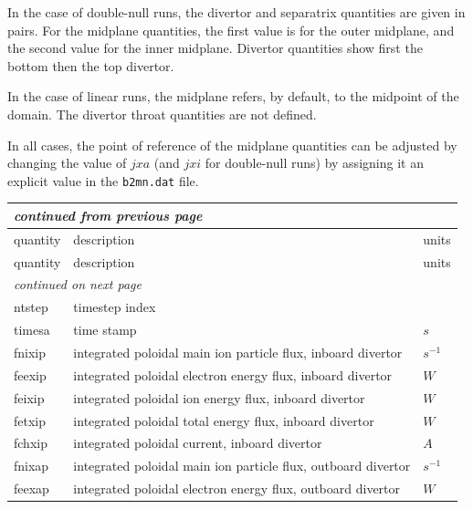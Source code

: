 \documentclass[a4paper,10pt]{report}
\begin{document}
In the case of double-null runs, the divertor and separatrix quantities are given in pairs. For the midplane quantities,
the first value is for the outer midplane, and the second value for the inner midplane. Divertor quantities show
first the bottom then the top divertor.

In the case of linear runs, the midplane refers, by default, to the midpoint of the domain.
The divertor throat quantities are not defined.

In all cases, the point of reference of the midplane quantities can be adjusted by changing the value of $jxa$
(and $jxi$ for double-null runs) by assigning it an explicit value in the {\tt b2mn.dat} file.

\begin{center}
    \begin{longtable}{|l|l|l|}
    \hline
    \multicolumn{3}{|l|}{\small\sl continued from previous page} \\
    \hline quantity & description & units \\
    \hline \endhead
    \hline quantity & description & units \\
    \hline \endfirsthead
    \hline
    \multicolumn{3}{|l|}{\small\sl continued on next page} \\
    \hline \endfoot
    \endlastfoot
ntstep \index{ntstep}\index{b2time.nc, ntstep} & timestep index & $  $ \\
timesa \index{timesa}\index{b2time.nc, timesa} & time stamp & $s $ \\
fnixip \index{fnixip}\index{b2time.nc, fnixip} & integrated poloidal main ion particle flux, inboard divertor & $s^{-1}$ \\
feexip \index{feexip}\index{b2time.nc, feexip} & integrated poloidal electron energy flux, inboard divertor & $W $ \\
feixip \index{feixip}\index{b2time.nc, feixip} & integrated poloidal ion energy flux, inboard divertor & $W $ \\
fetxip \index{fetxip}\index{b2time.nc, fetxip} & integrated poloidal total energy flux, inboard divertor & $W $ \\
fchxip \index{fchxip}\index{b2time.nc, fchxip} & integrated poloidal current, inboard divertor & $A $ \\
fnixap \index{fnixap}\index{b2time.nc, fnixap} & integrated poloidal main ion particle flux, outboard divertor & $s^{-1}$ \\
feexap \index{feexap}\index{b2time.nc, feexap} & integrated poloidal electron energy flux, outboard divertor & $W $ \\

\end{longtable}
\end{center}
\end{document}
